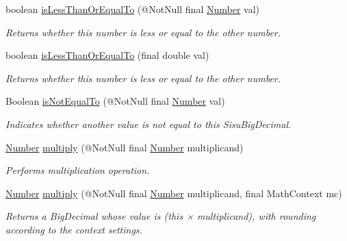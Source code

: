 \begin{DoxyCompactItemize}
boolean \hyperlink{classcom_1_1aarrelaakso_1_1drawl_1_1_drawl_number_af3936483f84eec933c41b7dc78bb473a}{is\+Less\+Than\+Or\+Equal\+To} (@Not\+Null final \hyperlink{interfacecom_1_1aarrelaakso_1_1drawl_1_1_number}{Number} val)
\begin{DoxyCompactList}\small\item\em Returns whether this number is less or equal to the other number. \end{DoxyCompactList}\item 
boolean \hyperlink{classcom_1_1aarrelaakso_1_1drawl_1_1_drawl_number_af112edcaa36d2518baab553fe11d39fe}{is\+Less\+Than\+Or\+Equal\+To} (final double val)
\begin{DoxyCompactList}\small\item\em Returns whether this number is less or equal to the other number. \end{DoxyCompactList}\item 
Boolean \hyperlink{classcom_1_1aarrelaakso_1_1drawl_1_1_drawl_number_a9d60605e816e0cb6430545fa3ea28b19}{is\+Not\+Equal\+To} (@Not\+Null final \hyperlink{interfacecom_1_1aarrelaakso_1_1drawl_1_1_number}{Number} val)
\begin{DoxyCompactList}\small\item\em Indicates whether another value is not equal to this Sisu\+Big\+Decimal. \end{DoxyCompactList}\item 
\hyperlink{interfacecom_1_1aarrelaakso_1_1drawl_1_1_number}{Number} \hyperlink{classcom_1_1aarrelaakso_1_1drawl_1_1_drawl_number_ad26a515fb406363d921543b82c428b46}{multiply} (@Not\+Null final \hyperlink{interfacecom_1_1aarrelaakso_1_1drawl_1_1_number}{Number} multiplicand)
\begin{DoxyCompactList}\small\item\em Performs multiplication operation. \end{DoxyCompactList}\item 
\hyperlink{interfacecom_1_1aarrelaakso_1_1drawl_1_1_number}{Number} \hyperlink{classcom_1_1aarrelaakso_1_1drawl_1_1_drawl_number_a11144527a91f9a750b9042a3ac84f631}{multiply} (@Not\+Null final \hyperlink{interfacecom_1_1aarrelaakso_1_1drawl_1_1_number}{Number} multiplicand, final Math\+Context mc)
\begin{DoxyCompactList}\small\item\em Returns a Big\+Decimal whose value is (this × multiplicand), with rounding according to the context settings. \end{DoxyCompactList}\item 

\end{DoxyCompactItemize}
